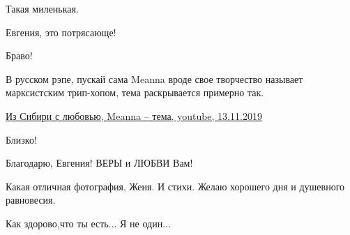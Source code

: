 \begin{itemize}
Такая миленькая.

 
Евгения, это потрясающе!

 
Браво!

 
В русском рэпе, пускай сама Meanna вроде свое творчество называет марксистским
трип-хопом, тема раскрывается примерно так.

\href{https://www.youtube.com/watch?v=pM8osrUKUAc}{%
Из Сибири с любовью, Meanna – тема, youtube, 13.11.2019%
%
}

 
Близко!

 
Благодарю, Евгения! ВЕРЫ и ЛЮБВИ Вам!

 
Какая отличная фотография, Женя. И стихи. Желаю хорошего дня и душевного равновесия.

 
Как здорово,что ты есть... Я не один...

\end{itemize}

